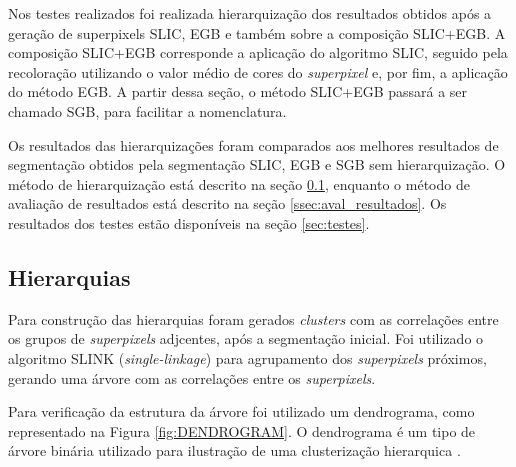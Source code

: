 \begin{document}
Nos testes realizados foi realizada hierarquização dos resultados obtidos após a geração de superpixels SLIC, EGB e também sobre a composição SLIC+EGB. A composição SLIC+EGB corresponde a aplicação do algoritmo SLIC, seguido pela recoloração utilizando o valor médio de cores do \textit{superpixel} e, por fim, a aplicação do método EGB. A partir dessa seção, o método SLIC+EGB passará a ser chamado SGB, para facilitar a nomenclatura.

Os resultados das hierarquizações foram comparados aos melhores resultados de segmentação obtidos pela segmentação SLIC, EGB e SGB sem hierarquização. O método de hierarquização está descrito na seção \ref{ssec:hierquia_segm}, enquanto o método de avaliação de resultados está descrito na seção \ref{ssec:aval_resultados}. Os resultados dos testes estão disponíveis na seção \ref{sec:testes}.


\subsection{Hierarquias} \label{ssec:hierquia_segm}


Para construção das hierarquias foram gerados \textit{clusters} com as correlações entre os grupos de \textit{superpixels} adjcentes, após a segmentação inicial. Foi utilizado o algoritmo SLINK (\textit{single-linkage}) para agrupamento dos \textit{superpixels} próximos, gerando uma árvore com as correlações entre os \textit{superpixels}.

Para verificação da estrutura da árvore foi utilizado um dendrograma, como representado na Figura \ref{fig:DENDROGRAM}. O dendrograma é um tipo de árvore binária utilizado para ilustração de uma clusterização hierarquica \cite{SINGLE_LINKAGE}.
\end{document}
